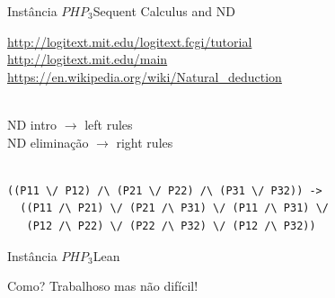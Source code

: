\documentclass{beamer}
\begin{document}
\begin{frame}[fragile]{Instância $PHP_3$}{Sequent Calculus and ND}

  \url{http://logitext.mit.edu/logitext.fcgi/tutorial}\\
  \url{http://logitext.mit.edu/main}\\
  \url{https://en.wikipedia.org/wiki/Natural_deduction}\\~\

  ND intro $\to$ left rules\\
  ND eliminação $\to$ right rules\\~\

  \begin{lstlisting}[basicstyle=\ttfamily\footnotesize]
  ((P11 \/ P12) /\ (P21 \/ P22) /\ (P31 \/ P32)) ->
  ((P11 /\ P21) \/ (P21 /\ P31) \/ (P11 /\ P31) \/
   (P12 /\ P22) \/ (P22 /\ P32) \/ (P12 /\ P32))
 \end{lstlisting}
\end{frame}


\begin{frame}[fragile]{Instância $PHP_3$}{Lean}

  Como? Trabalhoso mas não difícil!

\end{frame}
\end{document}
